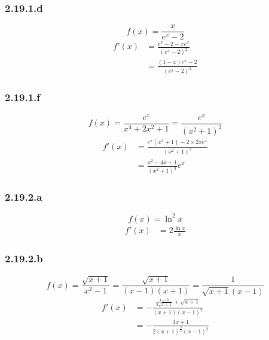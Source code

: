 \documentclass{report}
\begin{document}
\subsubsection*{2.19.1.d}
\begin{displaymath}
	f(x) = \frac{x}{e^x-2}
\end{displaymath}
\begin{equation*}
	\begin{split}
		f'(x) &= \frac{e^x-2 - xe^x}{(e^x-2)^2} \\
		      &= \frac{(1-x)e^x-2}{(e^x-2)^2} 
	\end{split}	
\end{equation*}

\subsubsection*{2.19.1.f}
\begin{displaymath}
	f(x) = \frac{e^x}{x^4 + 2x^2 +1} =\frac{e^x}{(x^2 +1)^2}
\end{displaymath}
\begin{equation*}
	\begin{split}
		f'(x) &= \frac{e^x(x^2+1)-2 \times 2xe^x}{(x^2 +1)^3} \\
		      &= \frac{x^2 - 4x + 1}{(x^2 +1)^3}e^x
	\end{split}	
\end{equation*}



\subsubsection*{2.19.2.a}
\begin{displaymath}
	f(x) = \ln^2 x
\end{displaymath}
\begin{equation*}
	\begin{split}
		f'(x) &= 2\frac{\ln x}{x}
	\end{split}	
\end{equation*}

\subsubsection*{2.19.2.b}
\begin{displaymath}
	f(x) = \frac{\sqrt{x+1}}{x^2-1} = \frac{\sqrt{x+1}}{(x-1)(x+1)}= \frac{1}{\sqrt{x+1}(x-1)}
\end{displaymath}
\begin{equation*}
	\begin{split}
		f'(x) &= -\frac{\frac{x-1}{2\sqrt{x+1}} + \sqrt{x+1}}{(x+1)(x-1)^2} \\
		      & = -\frac{3x+1}{2(x+1)^{\frac{3}{2}} (x-1)^2}
	\end{split}	
\end{equation*}
\end{document}
